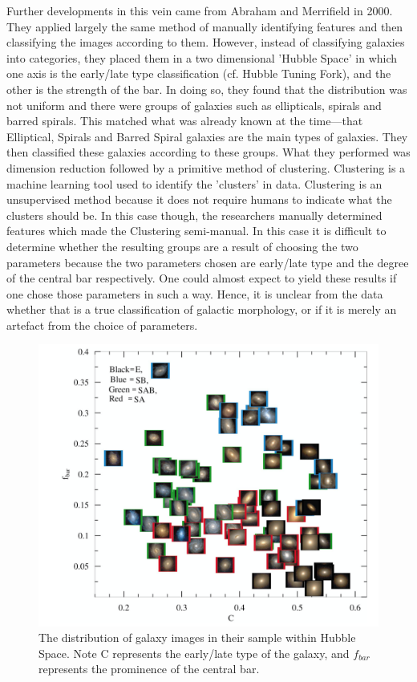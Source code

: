 \documentclass[a4paper,11pt]{article}
\begin{document}
Further developments in this vein came from Abraham and Merrifield in 2000.\cite{abraham_2000_explorations} They applied largely the same method of manually identifying features and then classifying the images according to them. However, instead of classifying galaxies into categories, they placed them in a two dimensional 'Hubble Space' in which one axis is the early/late type classification (cf. Hubble Tuning Fork), and the other is the strength of the bar. In doing so, they found that the distribution was not uniform and there were groups of galaxies such as ellipticals, spirals and barred spirals. This matched what was already known at the time—that Elliptical, Spirals and Barred Spiral galaxies are the main types of galaxies. They then classified these galaxies according to these groups. What they  performed was dimension reduction followed by a primitive method of clustering. Clustering is a machine learning tool used to identify the 'clusters' in data. Clustering is an unsupervised method because it does not require humans to indicate what the clusters should be. In this case though, the researchers manually determined features which made the Clustering semi-manual. In this case it is difficult to determine whether the resulting groups are a result of choosing the two parameters because the two parameters chosen are early/late type and the degree of the central bar respectively. One could almost expect to yield these results if one chose those parameters in such a way. Hence, it is unclear from the data whether that is a true classification of galactic morphology, or if it is merely an artefact from the choice of parameters.
\begin{figure}[ht]
\centering
\includegraphics[width=\textwidth]{Abraham.png}
\caption{\label{fig:Galaxies}The distribution of galaxy images in their sample within Hubble Space. Note C represents the early/late type of the galaxy, and $f_{bar}$ represents the prominence of the central bar. \cite{abraham_2000_explorations}}
\end{figure}
\end{document}
